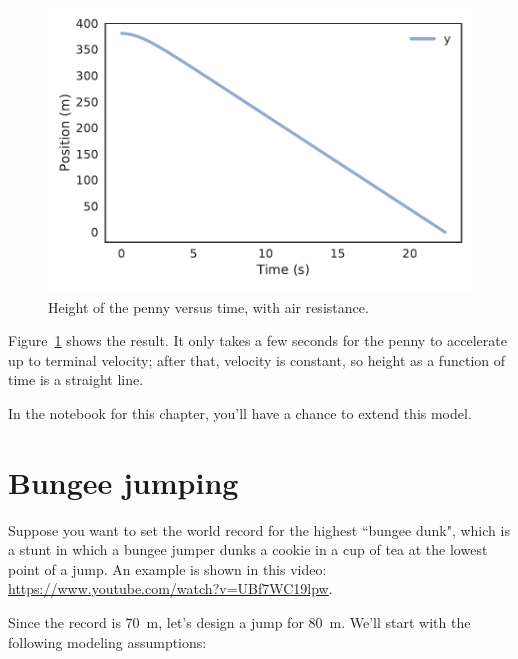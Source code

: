 \documentclass[12pt]{book}
\theoremstyle{exercise}
\begin{document}
\begin{figure}
\centerline{\includegraphics[height=3in]{figs/chap09-fig02.pdf}}
\caption{Height of the penny versus time, with air resistance.}
\label{chap09-fig02}
\end{figure}

Figure~\ref{chap09-fig02} shows the result.  It only takes a few seconds for the penny to accelerate up to terminal velocity; after that, velocity is constant, so height as a function of time is a straight line.


In the notebook for this chapter, you'll have a chance to extend this model.


\section{Bungee jumping}
\label{bungee}

Suppose you want to set the world record for the highest ``bungee dunk", which is a stunt in which a bungee jumper dunks a cookie in a cup of tea at the lowest point of a jump.  An example is shown in this video: \url{https://www.youtube.com/watch?v=UBf7WC19lpw}.

Since the record is \SI{70}{\meter}, let's design a jump for \SI{80}{\meter}.  We'll start with the following modeling assumptions:
\end{document}
